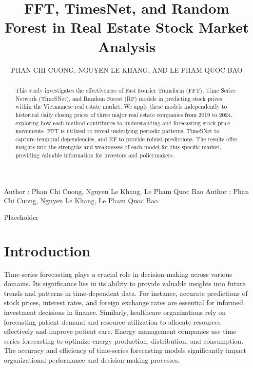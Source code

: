 \documentclass{ieeeojies}
\begin{document}
\title{FFT, TimesNet, and Random Forest in Real Estate Stock Market Analysis}

\author{\uppercase{Phan Chi Cuong},
\uppercase{Nguyen Le Khang, and Le Pham Quoc Bao}}

\address[1]{Faculty of Information Systems, University of Information Technology, (e-mail: 21520673@gm.uit.edu.vn)}
\address[2]{Faculty of Information Systems, University of Information Technology, (e-mail: 21520960@gm.uit.edu.vn)}
\address[3]{Faculty of Information Systems, University of Information Technology, (e-mail: 21521849@gm.uit.edu.vn)}

\markboth
{Author \headeretal: Phan Chi Cuong, Nguyen Le Khang, Le Pham Quoc Bao}
{Author \headeretal: Phan Chi Cuong, Nguyen Le Khang, Le Pham Quoc Bao}

\begin{abstract}
  This study investigates the effectiveness of Fast Fourier Transform (FFT), Time Series Network (TimeSNet), and Random Forest (RF) models in predicting stock prices within the Vietnamese real estate market.  We apply these models independently to historical daily closing prices of three major real estate companies from 2019 to 2024, exploring how each method contributes to understanding and forecasting stock price movements. FFT is utilized to reveal underlying periodic patterns, TimeSNet to capture temporal dependencies, and RF to provide robust predictions. The results offer insights into the strengths and weaknesses of each model for this specific market, providing valuable information for investors and policymakers.
\end{abstract}

\begin{keywords}
  Placeholder
\end{keywords}

\titlepgskip=-15pt

\maketitle

\section{Introduction}
\label{sec:introduction}
Time-series forecasting plays a crucial role in decision-making across various domains. Its significance lies in its ability to provide valuable insights into future trends and patterns in time-dependent data. For instance, accurate predictions of stock prices, interest rates, and foreign exchange rates are essential for informed investment decisions in finance. Similarly, healthcare organizations rely on forecasting patient demand and resource utilization to allocate resources effectively and improve patient care. Energy management companies use time series forecasting to optimize energy production, distribution, and consumption. The accuracy and efficiency of time-series forecasting models significantly impact organizational performance and decision-making processes.
\end{document}
